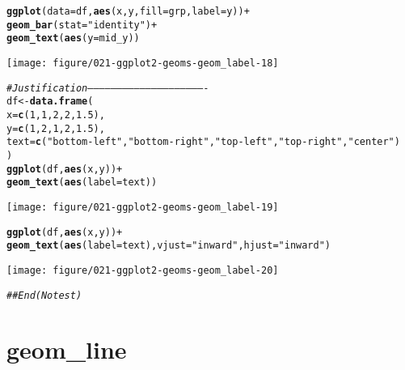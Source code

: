 \documentclass[a4paper,titlepage]{tufte-handout}\usepackage[]{graphicx}\usepackage[]{color}
\makeatletter
\def\maxwidth{ %
  \ifdim\Gin@nat@width>\linewidth
    \linewidth
  \else
    \Gin@nat@width
  \fi
}
\newcommand{\hlnum}[1]{\textcolor[rgb]{0.686,0.059,0.569}{#1}}%
\newcommand{\hlstr}[1]{\textcolor[rgb]{0.192,0.494,0.8}{#1}}%
\newcommand{\hlcom}[1]{\textcolor[rgb]{0.678,0.584,0.686}{\textit{#1}}}%
\newcommand{\hlopt}[1]{\textcolor[rgb]{0,0,0}{#1}}%
\newcommand{\hlstd}[1]{\textcolor[rgb]{0.345,0.345,0.345}{#1}}%
\newcommand{\hlkwb}[1]{\textcolor[rgb]{0.69,0.353,0.396}{#1}}%
\newcommand{\hlkwc}[1]{\textcolor[rgb]{0.333,0.667,0.333}{#1}}%
\newcommand{\hlkwd}[1]{\textcolor[rgb]{0.737,0.353,0.396}{\textbf{#1}}}%
\newenvironment{kframe}{%
 \def\at@end@of@kframe{}%
 \ifinner\ifhmode%
  \def\at@end@of@kframe{\end{minipage}}%
  \begin{minipage}{\columnwidth}%
 \fi\fi%
 \def\FrameCommand##1{\hskip\@totalleftmargin \hskip-\fboxsep
 \colorbox{shadecolor}{##1}\hskip-\fboxsep
     \hskip-\linewidth \hskip-\@totalleftmargin \hskip\columnwidth}%
 \MakeFramed {\advance\hsize-\width
   \@totalleftmargin\z@ \linewidth\hsize
   \@setminipage}}%
 {\par\unskip\endMakeFramed%
 \at@end@of@kframe}
\newenvironment{knitrout}{}{} %
\makeatother
\begin{document}
\begin{knitrout}
\begin{kframe}
\begin{alltt}
\hlkwd{ggplot}\hlstd{(}\hlkwc{data} \hlstd{= df,} \hlkwd{aes}\hlstd{(x, y,} \hlkwc{fill} \hlstd{= grp,} \hlkwc{label} \hlstd{= y))} \hlopt{+}
 \hlkwd{geom_bar}\hlstd{(}\hlkwc{stat} \hlstd{=} \hlstr{"identity"}\hlstd{)} \hlopt{+}
 \hlkwd{geom_text}\hlstd{(}\hlkwd{aes}\hlstd{(}\hlkwc{y} \hlstd{= mid_y))}
\end{alltt}
\end{kframe}
\texttt{[image: figure/021-ggplot2-geoms-geom\_label-18]} 
\begin{kframe}\begin{alltt}
\hlcom{# Justification -------------------------------------------------------------}
\hlstd{df} \hlkwb{<-} \hlkwd{data.frame}\hlstd{(}
  \hlkwc{x} \hlstd{=} \hlkwd{c}\hlstd{(}\hlnum{1}\hlstd{,} \hlnum{1}\hlstd{,} \hlnum{2}\hlstd{,} \hlnum{2}\hlstd{,} \hlnum{1.5}\hlstd{),}
  \hlkwc{y} \hlstd{=} \hlkwd{c}\hlstd{(}\hlnum{1}\hlstd{,} \hlnum{2}\hlstd{,} \hlnum{1}\hlstd{,} \hlnum{2}\hlstd{,} \hlnum{1.5}\hlstd{),}
  \hlkwc{text} \hlstd{=} \hlkwd{c}\hlstd{(}\hlstr{"bottom-left"}\hlstd{,} \hlstr{"bottom-right"}\hlstd{,} \hlstr{"top-left"}\hlstd{,} \hlstr{"top-right"}\hlstd{,} \hlstr{"center"}\hlstd{)}
\hlstd{)}
\hlkwd{ggplot}\hlstd{(df,} \hlkwd{aes}\hlstd{(x, y))} \hlopt{+}
  \hlkwd{geom_text}\hlstd{(}\hlkwd{aes}\hlstd{(}\hlkwc{label} \hlstd{= text))}
\end{alltt}
\end{kframe}
\texttt{[image: figure/021-ggplot2-geoms-geom\_label-19]} 
\begin{kframe}\begin{alltt}
\hlkwd{ggplot}\hlstd{(df,} \hlkwd{aes}\hlstd{(x, y))} \hlopt{+}
  \hlkwd{geom_text}\hlstd{(}\hlkwd{aes}\hlstd{(}\hlkwc{label} \hlstd{= text),} \hlkwc{vjust} \hlstd{=} \hlstr{"inward"}\hlstd{,} \hlkwc{hjust} \hlstd{=} \hlstr{"inward"}\hlstd{)}
\end{alltt}
\end{kframe}
\texttt{[image: figure/021-ggplot2-geoms-geom\_label-20]} 
\begin{kframe}\begin{alltt}
\hlcom{## End(No test)}
\end{alltt}
\end{kframe}
\end{knitrout}


\section{geom\_line}
\end{document}
